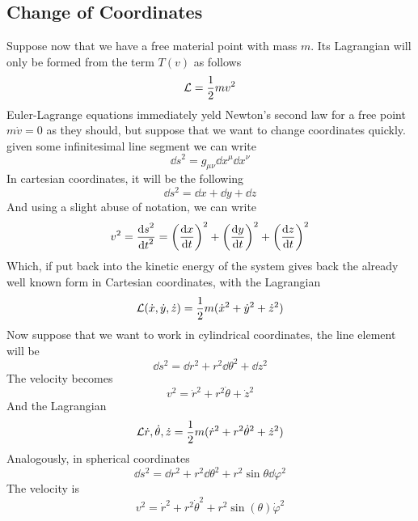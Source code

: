 \documentclass[../admech.tex]{subfiles}
\begin{document}
\subsection{Change of Coordinates}
Suppose now that we have a free material point with mass $m$. Its Lagrangian will only be formed from the term $T(v)$ as follows
\begin{equation}
	\mathcal{L}=\frac{1}{2}mv^2
	\label{eq:freepoint}
\end{equation}
Euler-Lagrange equations immediately yeld Newton's second law for a free point $m\dot{v}=0$ as they should, but suppose that we want to change coordinates quickly. given some infinitesimal line segment we can write
\begin{equation}
	\dd{s}^2=g_{\mu\nu}\dd{x}^\mu\dd{x}^\nu
	\label{eq:dsgen}
\end{equation}
In cartesian coordinates, it will be the following
\begin{equation*}
	\dd{s}^2=\dd{x}+\dd{y}+\dd{z}
\end{equation*}
And using a slight abuse of notation, we can write
\begin{equation*}
	v^2=\frac{\dd{s}^2}{\dd{t}^2}=\left( \dv{x}{t} \right)^2+\left( \dv{y}{t} \right)^2+\left( \dv{z}{t} \right)^2
\end{equation*}
Which, if put back into the kinetic energy of the system gives back the already well known form in Cartesian coordinates, with the Lagrangian
\begin{equation*}
	\mathcal{L}(\dot{x},\dot{y},\dot{z})=\frac{1}{2}m(\dot{x}^2+\dot{y}^2+\dot{z}^2)
\end{equation*}
Now suppose that we want to work in cylindrical coordinates, the line element will be
\begin{equation*}
	\dd{s}^2=\dd{r}^2+r^2\dd{\theta}^2+\dd{z}^2
\end{equation*}
The velocity becomes
\begin{equation*}
	v^2=\dot{r}^2+r^2\dot{\theta}+\dot{z}^2
\end{equation*}
And the Lagrangian
\begin{equation*}
	\mathcal{L}{\dot{r},\dot{\theta},\dot{z}}=\frac{1}{2}m(\dot{r}^2+r^2\dot{\theta}^2+\dot{z}^2)
\end{equation*}
Analogously, in spherical coordinates
\begin{equation*}
	\dd{s}^2=\dd{r}^2+r^2\dd{\theta}^2+r^2\sin\theta\dd{\varphi}^2
\end{equation*}
The velocity is
\begin{equation*}
	v^2=\dot{r}^2+r^2\dot{\theta}^2+r^2\sin(\theta)\dot{\varphi}^2
\end{equation*}
\end{document}
